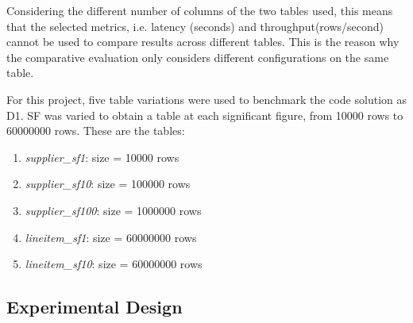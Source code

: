 Considering the different number of columns of the two tables used, this means that the selected metrics, i.e. latency (seconds) and throughput(rows/second) cannot be used to compare results across different tables. This is the reason why the comparative evaluation only considers different configurations on the same table.

For this project, five table variations were used to benchmark the code solution as D1. \gls{SF} was varied to obtain a table at each significant figure, from 10000 rows to 60000000 rows. These are the tables:
\begin{enumerate}
    \item \textit{supplier\_sf1}: size = 10000 rows
    \item \textit{supplier\_sf10}: size = 100000 rows
    \item \textit{supplier\_sf100}: size = 1000000 rows
    \item \textit{lineitem\_sf1}: size = 60000000 rows
    \item \textit{lineitem\_sf10}: size = 60000000 rows
\end{enumerate}

\subsection{Experimental Design}
\label{subsec:experimental_design}
%

